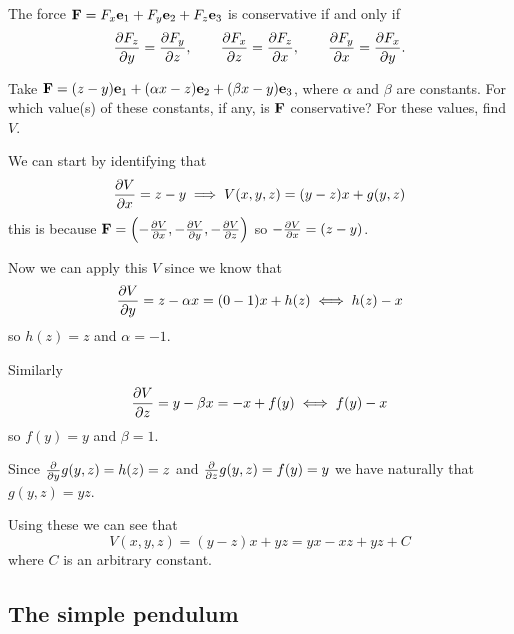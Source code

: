 \documentclass[10pt, a4paper]{article}
\begin{document}
\begin{remark}
    The force $\mbf{F} = F_x\mbf{e}_1 + F_y\mbf{e}_2 + F_z\mbf{e}_3$ is conservative if and only if
    \[
    \pd[F_z]{y} = \pd[F_y]{z},\qquad\pd[F_x]{z} = \pd[F_z]{x},\qquad\pd[F_y]{x} = \pd[F_x]{y}.
    \]
\end{remark}

\begin{example}
    Take $\mbf{F} = (z - y)\mbf{e}_1 + (\alpha x - z)\mbf{e}_2 + (\beta x - y)\mbf{e}_3$,
    where $\alpha$ and $\beta$ are constants.
    For which value(s) of these constants,
    if any,
    is $\mbf{F}$ conservative?
    For these values,
    find $V$.

    \begin{solution}
        We can start by identifying that
        \[
        \pd[V]{x} = z - y \implies V(x, y, z) = (y - z)x + g(y, z)
        \]
        this is because $\mbf{F} = \left(-\pd[V]{x}, -\pd[V]{y}, -\pd[V]{z}\right)$ so $-\pd[V]{x} = (z - y)$.

        Now we can apply this $V$ since we know that
        \[
        \pd[V]{y} = z - \alpha x = (0 - 1)x + h(z) \iff h(z) - x
        \]
        so $h(z) = z$ and $\alpha = -1$.

        Similarly
        \[
        \pd[V]{z} = y - \beta x = -x + f(y) \iff f(y) - x
        \]
        so $f(y) = y$ and $\beta = 1$.

        Since $\pd{y}g(y, z) = h(z) = z$ and $\pd{z}g(y, z) = f(y) = y$ we have naturally that $g(y, z) = yz$.

        Using these we can see that
        \[
        V(x, y, z) = (y - z)x + yz = yx - xz + yz + C
        \]
        where $C$ is an arbitrary constant.
    \end{solution}
\end{example}

\subsection{The simple pendulum}
\end{document}
